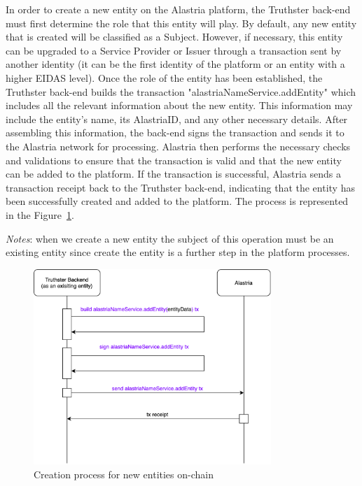 \documentclass[target=mst,aauheader=]{thud}
\begin{document}
In order to create a new entity on the Alastria platform, the Truthster back-end must first determine the role that this entity will play. By default, any new entity that is created will be classified as a Subject. However, if necessary, this entity can be upgraded to a Service Provider or Issuer through a transaction sent by another identity (it can be the first identity of the platform or an entity with a higher EIDAS level).
Once the role of the entity has been established, the Truthster back-end builds the transaction "alastriaNameService.addEntity" which includes all the relevant information about the new entity. This information may include the entity's name, its AlastriaID, and any other necessary details. After assembling this information, the back-end signs the transaction and sends it to the Alastria network for processing.
Alastria then performs the necessary checks and validations to ensure that the transaction is valid and that the new entity can be added to the platform. If the transaction is successful, Alastria sends a transaction receipt back to the Truthster back-end, indicating that the entity has been successfully created and added to the platform.
The process is represented in the Figure~\ref{fig:createNewGeneralEntity}.

\textit{Notes}: when we create a new entity the subject of this operation must be an existing entity since create the entity is a further step in the platform processes.

\begin{figure}
    \centering
    \includegraphics[width=0.8\textwidth]{images/createNewGeneralEntity.png}
    \caption{Creation process for new entities on-chain}
    \label{fig:createNewGeneralEntity}
\end{figure}
\end{document}
